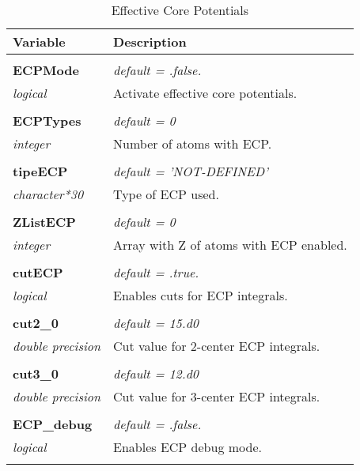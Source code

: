 \begin{Spacing}{1.0}
\begin{longtable}{ p{} p{} }

   \toprule
   \textbf{Variable} & Description \\*
   \midrule \\*
   \endhead

   \bottomrule
   \caption{Effective Core Potentials}
   \endfoot

   \textbf{ECPMode}
   &  \textit{default = .false. }
   \\*\textit{logical}
   & Activate effective core potentials.\\* \\

   \textbf{ECPTypes}
   &  \textit{default = 0}
   \\*\textit{integer}
   & Number of atoms with ECP.\\* \\

   \textbf{tipeECP}
   &  \textit{default = 'NOT-DEFINED'}
   \\*\textit{character*30}
   & Type of ECP used.\\* \\

   \textbf{ZListECP}
   &  \textit{default = 0}
   \\*\textit{integer}
   & Array with Z of atoms with ECP enabled.\\* \\

   \textbf{cutECP}
   &  \textit{default = .true. }
   \\*\textit{logical}
   & Enables cuts for ECP integrals.\\* \\

   \textbf{cut2\_0}
   &  \textit{default = 15.d0}
   \\*\textit{double precision}
   & Cut value for 2-center ECP integrals.\\* \\

   \textbf{cut3\_0}
   &  \textit{default = 12.d0}
   \\*\textit{double precision}
   & Cut value for 3-center ECP integrals.\\* \\

   \textbf{ECP\_debug}
   &  \textit{default = .false. }
   \\*\textit{logical}
   & Enables ECP debug mode.\\* \\


\end{longtable}
\end{Spacing}
